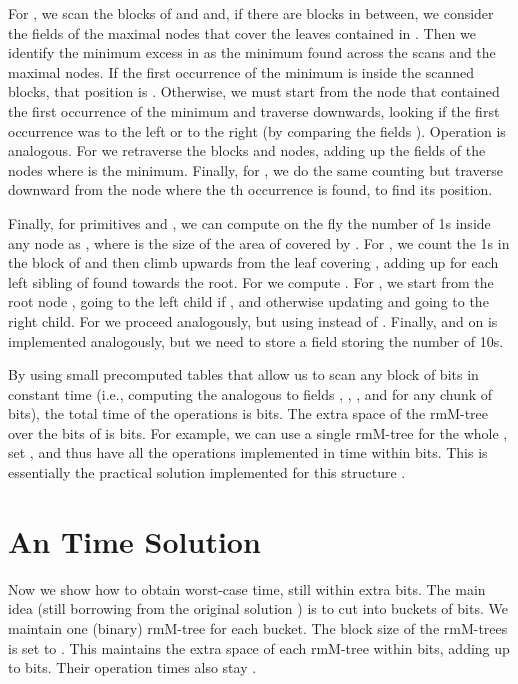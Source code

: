 \documentclass[11pt]{article}
\newcommand{\0}{\mathit{0}}
\newcommand{\1}{\mathit{1}}
\begin{document}
For , we scan the blocks of  and  and, if there are blocks
in between, we consider the fields  of the 
maximal nodes that cover the leaves contained in . Then we identify
the minimum excess in  as the minimum found across the scans and the
maximal nodes. If the first occurrence of the minimum is inside the scanned blocks, that
position is . Otherwise, we must start from the node  that
contained the first occurrence of the minimum and traverse downwards, looking
if the first occurrence was to the left or to the right (by comparing the
fields ). Operation  is analogous. For  we
retraverse the blocks and nodes, adding up the fields
 of the nodes where  is the minimum. Finally,
for , we do the same counting but traverse downward from
the node  where the th occurrence is found, to find its position.

Finally, for primitives  and , we
can compute on the fly the number of 1s inside any node  as
, where  is the size of the area of  covered by
. For , we count the 1s
in the block of  and then climb upwards from the leaf  covering ,
adding up  for each left sibling of  found towards the root. For
 we compute . For , we start from the
root node , going to the left child  if , and otherwise
updating  and going to the right child. For
 we proceed analogously, but using  instead of
. Finally,  and  on  is implemented analogously,
but we need to store a field  storing the number of 10s.

By using small precomputed tables that allow us to scan any block of 
 bits in constant time (i.e., computing the analogous to fields
, , , and  for any chunk of  bits), the total time of the
operations is  bits. The extra space of the rmM-tree over 
the  bits of  is  bits. For example, we can use a
single rmM-tree for the whole , set , and thus have all the
operations implemented in time  within  bits.
This is essentially the practical solution implemented for this structure
\cite{ACNS10}.

\section{An  Time Solution} 

Now we show how to obtain  worst-case time, still within
 extra bits. The main idea (still borrowing from the original
solution \cite{NS14}) is to cut  into  buckets of 
 bits. We maintain one (binary) rmM-tree for each 
bucket. The block size of the rmM-trees is set to . 
This maintains the extra space of each rmM-tree within
 bits, adding up to 
bits. Their operation times also stay .
\end{document}
